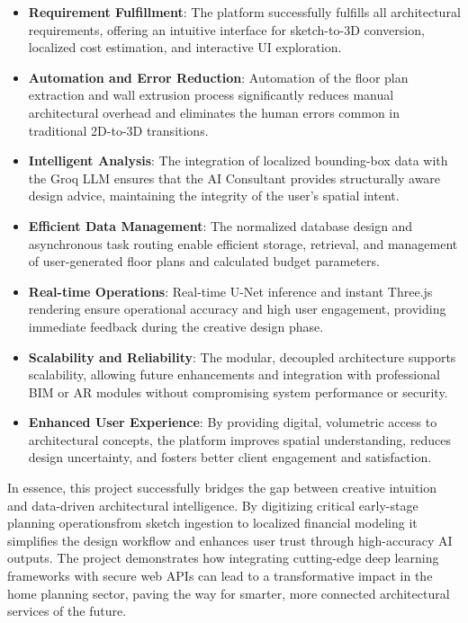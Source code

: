 \documentclass[12pt]{report}
\begin{document}
\begin{itemize}
    \item \textbf{Requirement Fulfillment}: The platform successfully fulfills all architectural requirements, offering an intuitive interface for sketch-to-3D conversion, localized cost estimation, and interactive UI exploration.
    
    \item \textbf{Automation and Error Reduction}: Automation of the floor plan extraction and wall extrusion process significantly reduces manual architectural overhead and eliminates the human errors common in traditional 2D-to-3D transitions.
    
    \item \textbf{Intelligent Analysis}: The integration of localized bounding-box data with the Groq LLM ensures that the AI Consultant provides structurally aware design advice, maintaining the integrity of the user's spatial intent.
    
    \item \textbf{Efficient Data Management}: The normalized database design and asynchronous task routing enable efficient storage, retrieval, and management of user-generated floor plans and calculated budget parameters.
    
    \item \textbf{Real-time Operations}: Real-time U-Net inference and instant Three.js rendering ensure operational accuracy and high user engagement, providing immediate feedback during the creative design phase.
    
    \item \textbf{Scalability and Reliability}: The modular, decoupled architecture supports scalability, allowing future enhancements and integration with professional BIM or AR modules without compromising system performance or security.
    
    \item \textbf{Enhanced User Experience}: By providing digital, volumetric access to architectural concepts, the platform improves spatial understanding, reduces design uncertainty, and fosters better client engagement and satisfaction.
\end{itemize}

In essence, this project successfully bridges the gap between creative intuition and data-driven architectural intelligence. By digitizing critical early-stage planning operations\-from sketch ingestion to localized financial modeling it simplifies the design workflow and enhances user trust through high-accuracy AI outputs. The project demonstrates how integrating cutting-edge deep learning frameworks with secure web APIs can lead to a transformative impact in the home planning sector, paving the way for smarter, more connected architectural services of the future.
\end{document}
